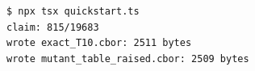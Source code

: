 \begin{Verbatim}[fontsize=\small,frame=leftline,rulecolor=\color{accentmid},framesep=3mm,xleftmargin=3mm]
$ npx tsx quickstart.ts
claim: 815/19683
wrote exact_T10.cbor: 2511 bytes
wrote mutant_table_raised.cbor: 2509 bytes
\end{Verbatim}
